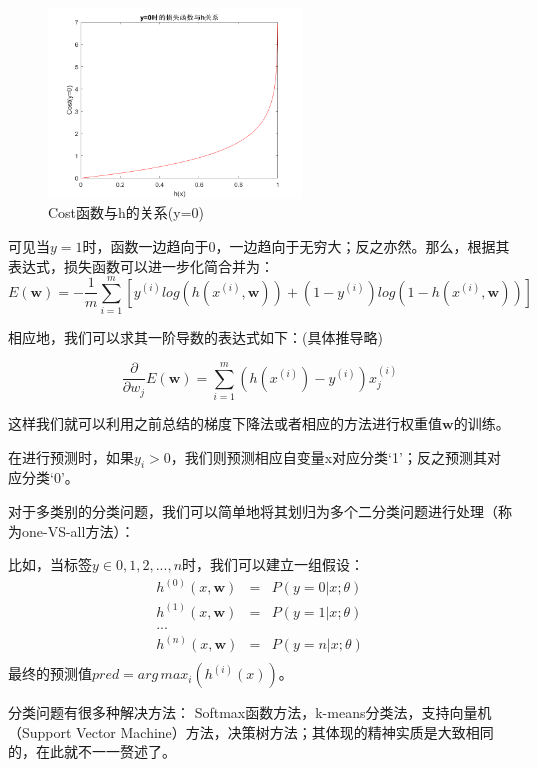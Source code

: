 \begin{figure}[htbp]
   \centering
   \includegraphics[width=0.6\textwidth]{SigmoidCost0.png} %
   \caption{Cost函数与h的关系(y=0)}
   \label{fig:sigmoidcost0}
\end{figure}

可见当$y=1$时，函数一边趋向于0，一边趋向于无穷大；反之亦然。那么，根据其表达式，损失函数可以进一步化简合并为：
\begin{equation}
E(\mathbf{w}) = -\dfrac{1}{m} \sum^m_{i=1} [y^{(i)}log(h(x^{(i)},\mathbf{w})) + (1 - y^{(i)})log(1 - h(x^{(i)},\mathbf{w})) ]
\end{equation}

相应地，我们可以求其一阶导数的表达式如下：(具体推导略)

\begin{equation}
\dfrac{\partial}{\partial w_j} E(\mathbf{w}) = \sum^m_{i=1} (h(x^{(i)}) - y^{(i)})x^{(i)}_j
\end{equation}

这样我们就可以利用之前总结的梯度下降法或者相应的方法进行权重值$\mathbf{w}$的训练。

在进行预测时，如果$y_i>0$，我们则预测相应自变量x对应分类`1'；反之预测其对应分类`0'。 

对于多类别的分类问题，我们可以简单地将其划归为多个二分类问题进行处理（称为one-VS-all方法）：

比如，当标签$y\in {0,1,2,...,n}$时，我们可以建立一组假设：
$$
\begin{aligned}
h^{(0)}(x,\mathbf{w}) & = & P(y=0|x;\theta)\\
h^{(1)}(x,\mathbf{w}) & = & P(y=1|x;\theta)\\
...\\
h^{(n)}(x,\mathbf{w}) & = & P(y=n|x;\theta)\\
\end{aligned}
$$
最终的预测值$pred = arg\, max_i (h^{(i)}(x))$。

分类问题有很多种解决方法： Softmax函数方法，k-means分类法，支持向量机（Support Vector Machine）方法，决策树方法\cite{standford_machine_learning_cs229}；其体现的精神实质是大致相同的，在此就不一一赘述了。

